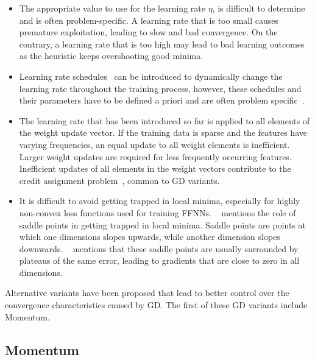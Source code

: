 \begin{itemize}
	\item The appropriate value to use for the learning rate $\eta$, is difficult to determine and is often problem-specific. A learning rate that is too small causes premature exploitation, leading to slow and bad convergence. On the contrary, a learning rate that is too high may lead to bad learning outcomes as the heuristic keeps overshooting good minima.

	\item Learning rate schedules~\cite{ref:robbins:1951} can be introduced to dynamically change the learning rate throughout the training process, however, these schedules and their parameters have to be defined a priori and are often problem specific~\cite{ref:darken:1992}.

	\item The learning rate that has been introduced so far is applied to all elements of the weight update vector. If the training data is sparse and the features have varying frequencies, an equal update to all weight elements is inefficient. Larger weight updates are required for less frequently occurring features. Inefficient updates of all elements in the weight vectors contribute to the credit assignment problem~\cite{ref:rumelhart:1986}, common to \acs{GD} variants.

	\item It is difficult to avoid getting trapped in local minima, especially for highly non-convex loss functions used for training \acp{FFNN}. \citeauthor{ref:dauphin:2014}~\cite{ref:dauphin:2014} mentions the role of saddle points in getting trapped in local minima. Saddle points are points at which one dimensions slopes upwards, while another dimension slopes downwards. \citeauthor{ref:ruder:2016}~\cite{ref:ruder:2016} mentions that these saddle points are usually surrounded by plateaus of the same error, leading to gradients that are close to zero in all dimensions.
\end{itemize}

Alternative variants have been proposed that lead to better control over the convergence characteristics caused by \acs{GD}. The first of these \acs{GD} variants include \acs{Momentum}.

\subsection{Momentum}\label{sec:heuristics:gd:momentum}

